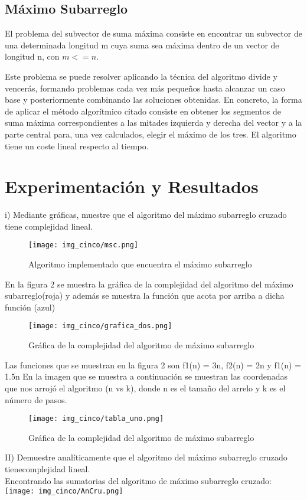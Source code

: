 \documentclass[12pt,twoside]{article}
\begin{document}
\subsection{Máximo Subarreglo} 
El problema del subvector de suma máxima consiste en encontrar un subvector de una determinada longitud m cuya suma sea máxima dentro de un vector de longitud n, con $m<=n$.

Este problema se puede resolver aplicando la técnica del algoritmo divide y vencerás, formando problemas cada vez más pequeños hasta alcanzar un caso base y posteriormente combinando las soluciones obtenidas. En concreto, la forma de aplicar el método algorítmico citado consiste en obtener los segmentos de suma máxima correspondientes a las mitades izquierda y derecha del vector y a la parte central para, una vez calculados, elegir el máximo de los tres. El algoritmo tiene un coste lineal respecto al tiempo.

\vspace{20 mm}
\section{Experimentación y Resultados}
i) Mediante gráficas, muestre que el algoritmo del máximo subarreglo cruzado tiene complejidad lineal.
\newline
\begin{figure}[H]
\centering
\texttt{[image: img\_cinco/msc.png]}
\caption{Algoritmo implementado que encuentra el máximo subarreglo}
\end{figure}
En la figura 2 se muestra la gráfica de la complejidad del algoritmo del máximo subarreglo(roja) y además se muestra la función que acota por arriba a dicha función (azul)

\vspace{10 mm}
\begin{figure}[H]
\centering
\texttt{[image: img\_cinco/grafica\_dos.png]}
\caption{Gráfica de la complejidad del algoritmo de máximo subarreglo}
\end{figure}
\newline
\newline
Las funciones que se muestran en la figura 2 son f1(n) = 3n, f2(n) = 2n y f1(n) = 1.5n
\newline
\newline
En la imagen que se muestra a continuación se muestran las coordenadas que nos arrojó el algoritmo (n vs k), donde n es el tamaño del arrelo y k es el número de pasos.
\newline
\newline
\begin{figure}[H]
\centering
\texttt{[image: img\_cinco/tabla\_uno.png]}
\caption{Gráfica de la complejidad del algoritmo de máximo subarreglo}
\end{figure}
\vspace{10 mm}
II) Demuestre analíticamente que el algoritmo del máximo subarreglo cruzado tienecomplejidad lineal.
\\Encontrando las sumatorias del algoritmo de máximo subarreglo cruzado:\\
\texttt{[image: img\_cinco/AnCru.png]}
\end{document}
